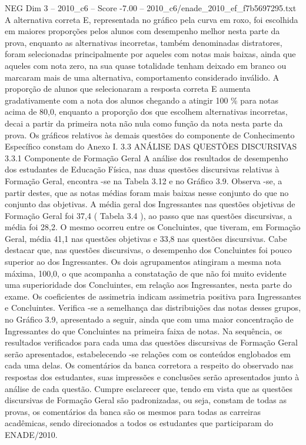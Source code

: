 \begin{textsample}{NEG Dim 3 – 2010\_c6 – Score -7.00 – 2010\_c6/enade\_2010\_ef\_f7b5697295.txt}
A alternativa correta E, representada no gráfico pela curva em roxo, foi escolhida em maiores proporções pelos alunos com desempenho melhor nesta parte da prova, enquanto as alternativas incorretas, também denominadas distratores, foram selecionadas principalmente por aqueles com notas mais baixas, ainda que aqueles com nota zero, na sua quase totalidade tenham deixado em branco ou marcaram mais de uma alternativa, comportamento considerado inválido.
A proporção de alunos que selecionaram a resposta correta E aumenta gradativamente com a nota dos alunos chegando a atingir 100 \% para notas acima de 80,0, enquanto a proporção dos que escolhem alternativas incorretas, decai a partir da primeira nota não nula como função da nota nesta parte da prova.
Os gráficos relativos às demais questões do componente de Conhecimento Específico constam do Anexo I. 3.3 ANÁLISE DAS QUESTÕES DISCURSIVAS 3.3.1 Componente de Formação Geral A análise dos resultados de desempenho dos estudantes de Educação Física, nas duas questões discursivas relativas à Formação Geral, encontra -se na Tabela 3.12 e no Gráfico 3.9.
Observa -se, a partir destes, que as notas médias foram mais baixas nesse conjunto do que no conjunto das objetivas.
A média geral dos Ingressantes nas questões objetivas de Formação Geral foi 37,4 ( Tabela 3.4 ), ao passo que nas questões discursivas, a média foi 28,2.
O mesmo ocorreu entre os Concluintes, que tiveram, em Formação Geral, média 41,1 nas questões objetivas e 33,8 nas questões discursivas.
Cabe destacar que, nas questões discursivas, o desempenho dos Concluintes foi pouco superior ao dos Ingressantes.
Os dois agrupamentos atingiram a mesma nota máxima, 100,0, o que acompanha a constatação de que não foi muito evidente uma superioridade dos Concluintes, em relação aos Ingressantes, nesta parte do exame.
Os coeficientes de assimetria indicam assimetria positiva para Ingressantes e Concluintes.
Verifica -se a semelhança das distribuições das notas desses grupos, no Gráfico 3.9, apresentado a seguir, ainda que com uma maior concentração de Ingressantes do que Concluintes na primeira faixa de notas.
Na sequência, os resultados verificados para cada uma das questões discursivas de Formação Geral serão apresentados, estabelecendo -se relações com os conteúdos englobados em cada uma delas.
Os comentários da banca corretora a respeito do observado nas respostas dos estudantes, suas impressões e conclusões serão apresentados junto à análise de cada questão.
Cumpre esclarecer que, tendo em vista que as questões discursivas de Formação Geral são padronizadas, ou seja, constam de todas as provas, os comentários da banca são os mesmos para todas as carreiras acadêmicas, sendo direcionados a todos os estudantes que participaram do ENADE/2010.

\end{textsample}
